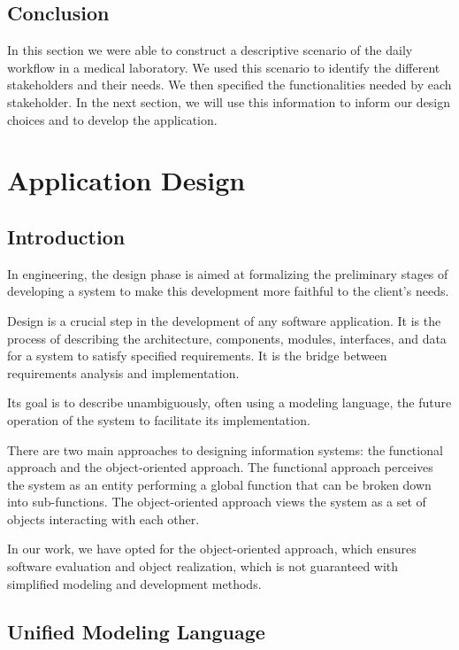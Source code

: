 \documentclass{article}
\begin{document}
\subsection[Conclusion]{Conclusion}
In this section we were able to construct a descriptive scenario of the daily workflow in a medical laboratory. We used this scenario to identify the different stakeholders and their needs. We then specified the functionalities needed by each stakeholder. In the next section, we will use this information to inform our design choices and to develop the application.


\newpage
\section{Application Design}

\subsection[Introduction]{Introduction}

In engineering, the design phase is aimed at formalizing the preliminary stages of developing a system to make this development more faithful to the client's needs.

Design is a crucial step in the development of any software application. It is the process of describing the architecture, components, modules, interfaces, and data for a system to satisfy specified requirements. It is the bridge between requirements analysis and implementation.

Its goal is to describe unambiguously, often using a modeling language, the future operation of the system to facilitate its implementation.

There are two main approaches to designing information systems: the functional approach and the object-oriented approach. The functional approach perceives the system as an entity performing a global function that can be broken down into sub-functions. The object-oriented approach views the system as a set of objects interacting with each other. 

In our work, we have opted for the object-oriented approach, which ensures software evaluation and object realization, which is not guaranteed with simplified modeling and development methods.

\subsection[Unified Modeling Language]{Unified Modeling Language}
\end{document}
